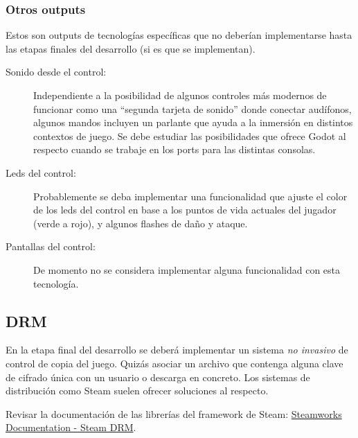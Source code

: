 \subsubsection{Otros outputs}\label{io:output-otros-outputs}
Estos son outputs de tecnologías específicas que no deberían implementarse hasta las etapas finales del desarrollo (si es que se implementan).

\begin{description}
\item[Sonido desde el control:] Independiente a la posibilidad de algunos controles más modernos de funcionar como una “segunda tarjeta de sonido” donde conectar audífonos, algunos mandos incluyen un parlante que ayuda a la inmersión en distintos contextos de juego. Se debe estudiar las posibilidades que ofrece Godot al respecto cuando se trabaje en los ports para las distintas consolas.

\item[Leds del control:] Probablemente se deba implementar una funcionalidad que ajuste el color de los leds del control en base a los puntos de vida actuales del jugador (verde a rojo), y algunos flashes de daño y ataque.

\item[Pantallas del control:] De momento no se considera implementar alguna funcionalidad con esta tecnología.
\end{description}

\subsection{DRM}\label{io:drm}
En la etapa final del desarrollo se deberá implementar un sistema \emph{no invasivo} de control de copia del juego. Quizás asociar un archivo que contenga alguna clave de cifrado única con un usuario o descarga en concreto. Los sistemas de distribución como Steam suelen ofrecer soluciones al respecto.

Revisar la documentación de las librerías del framework de Steam: \href{https://partner.steamgames.com/doc/features/drm}{Steamworks Documentation - Steam DRM}.